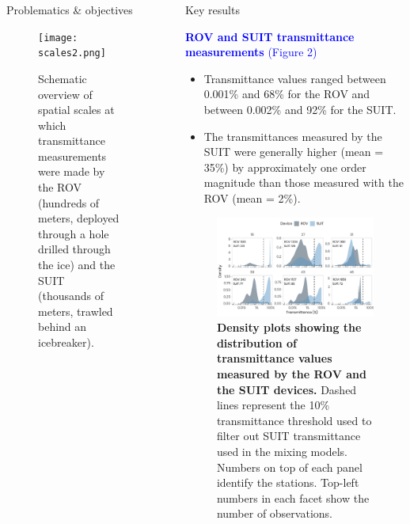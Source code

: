 \documentclass[final]{beamer}
\newlength{\sepwidth}
\newlength{\colwidth}
\newcommand{\separatorcolumn}{\begin{column}{\sepwidth}\end{column}}
\begin{document}
\begin{frame}[t]
\begin{columns}[t]
\begin{column}{\colwidth}
\begin{block}{Problematics \& objectives}
				\begin{figure}
					\centering
					\texttt{[image: scales2.png]}
					\caption{Schematic overview of spatial scales at which transmittance measurements were made by the ROV (hundreds of meters, deployed through a hole drilled through the ice) and the SUIT (thousands of meters, trawled behind an icebreaker).}
				\end{figure}

			\end{block}

		\end{column}

		\separatorcolumn

		\begin{column}{\colwidth}

			\begin{block}{Key results}

				\textcolor{blue}{\large \textbf{ROV and SUIT transmittance measurements} (Figure 2)}

				\begin{itemize}
					\justifying
					\setlength\itemsep{2.5em}
					\item Transmittance values ranged between 0.001\% and 68\% for the ROV and between 0.002\% and 92\% for the SUIT.
					\item The transmittances measured by the SUIT were generally higher (mean = 35\%) by approximately one order magnitude than those measured with the ROV (mean = 2\%).
				\end{itemize}

				\vspace{-25mm}
				\begin{figure}
					\centering
					\includegraphics[scale = 1.75]{graphs/fig3.pdf}
					\caption{\textbf{Density plots showing the distribution of transmittance values measured by the ROV and the SUIT devices.} Dashed lines represent the 10\% transmittance threshold used to filter out SUIT transmittance used in the mixing models. Numbers on top of each panel identify the stations. Top-left numbers in each facet show the number of observations.}
				\end{figure}


\end{block}
\end{column}
\end{columns}
\end{frame}
\end{document}

